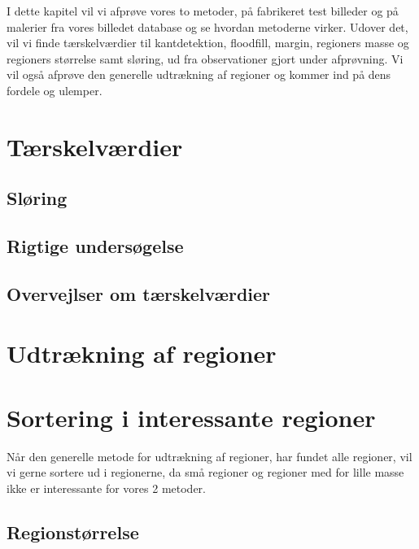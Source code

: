{
{\sffamily
I dette kapitel vil vi afprøve vores to metoder, på fabrikeret test
billeder og på malerier fra vores billedet database og se hvordan
metoderne virker. Udover det, vil vi finde tærskelværdier til
kantdetektion, floodfill, margin, regioners masse og regioners størrelse
samt sløring, ud fra observationer gjort under afprøvning. Vi vil også
afprøve den generelle udtrækning af regioner og kommer ind på dens
fordele og ulemper.}

\section{Tærskelværdier\label{terskelverdi}}

\clearpage

\subsection{Sløring}

\clearpage

\subsection{Rigtige undersøgelse}


\subsection{Overvejlser om tærskelværdier}


\section{Udtrækning af regioner\label{region_detektor}}

\clearpage


\section{Sortering i interessante regioner}
{\sffamily 
Når den generelle metode for udtrækning af regioner, har fundet alle regioner, vil vi gerne sortere ud i
regionerne, da små regioner og regioner med for lille masse ikke er
interessante for vores 2 metoder.
}


\subsection{Regionstørrelse \label{region_stoerlse}}

\clearpage

}
